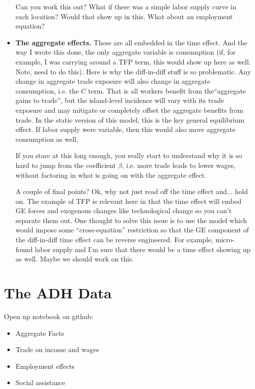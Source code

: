 \documentclass[pdftex,12pt]{article}
\begin{document}
\begin{itemize}
    Can you work this out? What if there was a simple labor supply curve in each location? Would that show up in this. What about an employment equation?

\item \textbf{The aggregate effects.} These are all embedded in the time effect. And the way I wrote this done, the only aggregate variable is consumption (if, for example, I was carrying around a TFP term, this would show up here as well. Note, need to do this). Here is why the diff-in-diff stuff is so problematic.  Any change in aggregate trade exposure will also change in aggregate consumption, i.e. the $C$ term. That is all workers benefit from the``aggregate gains to trade'', but the island-level incidence will vary with its trade exposure and may mitigate or completely offset the aggregate benefits from trade. In the static version of this model, this is the key general equilibrium effect. If labor supply were variable, then this would also move aggregate consumption as well.

    If you stare at this long enough, you really start to understand why it is so hard to jump from the coefficient $\beta$, i.e. more trade leads to lower wages, without factoring in what is going on with the aggregate effect.

    A couple of final points? Ok, why not just read off the time effect and... hold on. The example of TFP is relevant here in that the time effect will embed GE forces and exogenous changes like technological change so you can't separate them out. One thought to solve this issue is to use the model which would impose some ``cross-equation'' restriction so that the GE component of the diff-in-diff time effect can be reverse engineered. For example, micro-found labor supply and I'm sure that there would be a time effect showing up as well. Maybe we should work on this.
\end{itemize}



\newpage

\section{The ADH Data}

Open up notebook on github:

\begin{itemize}
\item Aggregate Facts

\item Trade on income and wages

\item Employment effects

\item Social assistance
\end{itemize}
\end{document}
